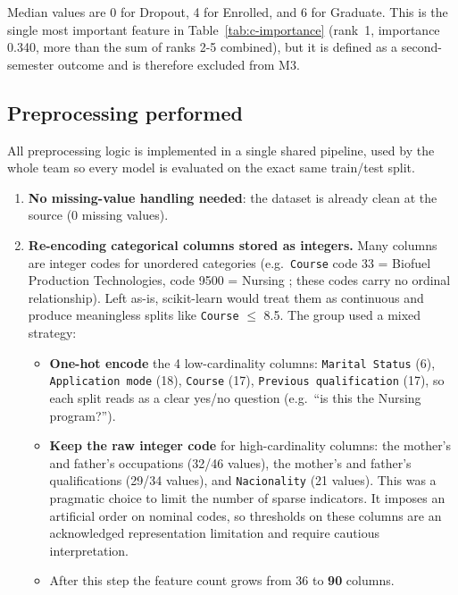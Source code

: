 Median values are 0 for Dropout, 4 for Enrolled, and 6 for Graduate. This
is the single most important feature in Table~\ref{tab:c-importance}
(rank~1, importance 0.340, more than the sum of ranks 2-5 combined), but
it is defined as a second-semester outcome and is therefore excluded from M3.

\subsection{Preprocessing performed}

All preprocessing logic is implemented in a single shared pipeline, used
by the whole team so every model is evaluated on the exact same
train/test split.

\begin{enumerate}
  \item \textbf{No missing-value handling needed}: the dataset is
    already clean at the source (0 missing values).
  \item \textbf{Re-encoding categorical columns stored as integers.} Many
    columns are integer codes for unordered categories (e.g.\
    \texttt{Course} code 33 = Biofuel Production Technologies, code 9500
    = Nursing \citep[Variables Table, row ``Course'']{realinho2021dataset};
    these codes carry no ordinal relationship). Left as-is,
    scikit-learn would treat them as continuous and produce meaningless
    splits like \texttt{Course} $\le$ 8.5. The group used a mixed
    strategy:
  \begin{itemize}
    \item \textbf{One-hot encode} the 4 low-cardinality columns:
      \texttt{Marital Status} (6), \texttt{Application mode} (18),
      \texttt{Course} (17), \texttt{Previous qualification} (17), so
      each split reads as a clear yes/no question (e.g.\ ``is this the
      Nursing program?'').
    \item \textbf{Keep the raw integer code} for high-cardinality
      columns: the mother's and father's occupations (32/46 values),
      the mother's and father's qualifications (29/34 values), and
      \texttt{Nacionality} (21 values). This was a pragmatic choice to
      limit the number of sparse indicators. It imposes an artificial
      order on nominal codes, so thresholds on these columns are an
      acknowledged representation limitation and require cautious
      interpretation.
    \item After this step the feature count grows from 36 to
      \textbf{90} columns.
  \end{itemize}

\end{enumerate}
